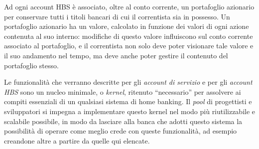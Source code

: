 Ad ogni account HBS è associato, oltre al conto corrente, un portafoglio azionario per conservare tutti i titoli bancari di cui il correntista sia in possesso. Un portafoglio azionario ha un valore, calcolato in funzione dei valori di ogni azione contenuta al suo interno: modifiche di questo valore influiscono sul conto corrente associato al portafoglio, e il correntista non solo deve poter visionare tale valore e il suo andamento nel tempo, ma deve anche poter gestire il contenuto del portafoglio stesso.


Le funzionalità che verranno descritte per gli \emph{account di servizio} e per gli \emph{account HBS} sono un  nucleo minimale, o \emph{kernel}, ritenuto ``necessario'' per assolvere ai compiti essenziali di un qualsiasi sistema di home banking.
Il \emph{pool} di progettisti e sviluppatori si impegna a implementare questo kernel nel modo più riutilizzabile e scalabile possibile, in modo da lasciare alla banca che adotti questo sistema la possibilità di operare come meglio crede con queste funzionalità, ad esempio creandone altre a partire da quelle qui elencate.

